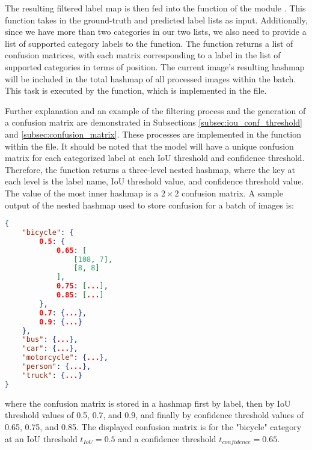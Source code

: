 The resulting filtered label map is then fed into the  function of the  module \cite{skm_multilabel_confusion_matrix}. This function takes in the ground-truth and predicted label lists as input. Additionally, since we have more than two categories in our two lists, we also need to provide a list of supported category labels to the function. The  function returns a list of confusion matrices, with each matrix corresponding to a label in the list of supported categories in terms of position. The current image's resulting hashmap will be included in the total hashmap of all processed images within the batch. This task is executed by the  function, which is implemented in the  file. 

Further explanation and an example of the filtering process and the generation of a confusion matrix are demonstrated in Subsections \ref{subsec:iou_conf_threshold} and \ref{subsec:confusion_matrix}. These processes are implemented in the  function within the  file. It should be noted that the model will have a unique confusion matrix for each categorized label at each IoU threshold and confidence threshold. Therefore, the  function returns a three-level nested hashmap, where the key at each level is the label name, IoU threshold value, and confidence threshold value. The value of the most inner hashmap is a $2 \times 2$ confusion matrix. A sample output of the nested hashmap used to store confusion for a batch of images is:
\begin{lstlisting}[language=json,firstnumber=1]
{
    "bicycle": {
        0.5: {
            0.65: [
                [108, 7],
                [8, 8]
            ],
            0.75: [...],
            0.85: [...]
        },
        0.7: {...},
        0.9: {...}
    },
    "bus": {...},
    "car": {...},
    "motorcycle": {...},
    "person": {...},
    "truck": {...}
}
\end{lstlisting}
where the confusion matrix is stored in a hashmap first by label, then by IoU threshold values of 0.5, 0.7, and 0.9, and finally by confidence threshold values of 0.65, 0.75, and 0.85. The displayed confusion matrix is for the "bicycle" category at an IoU threshold $t_{IoU}=0.5$ and a confidence threshold $t_{confidence}=0.65$.

